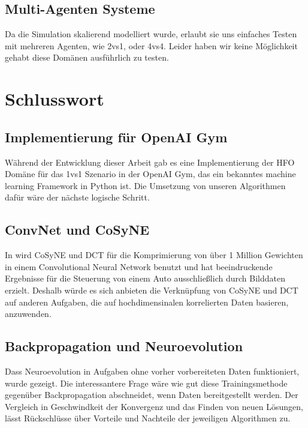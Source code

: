         \subsection*{Multi-Agenten Systeme}
            Da die Simulation skalierend modelliert wurde, erlaubt sie uns einfaches Testen mit mehreren Agenten, wie 2vs1, oder 4vs4. Leider haben wir keine Möglichkeit gehabt diese Domänen ausführlich zu testen.

\newpage

    \section{Schlusswort}

        \subsection*{Implementierung für OpenAI Gym}
            Während der Entwicklung dieser Arbeit gab es eine Implementierung der HFO Domäne für das 1vs1 Szenario in der OpenAI Gym, das ein bekanntes machine learning Framework in Python ist. Die Umsetzung von unseren Algorithmen dafür wäre der nächste logische Schritt.

        \subsection*{ConvNet und CoSyNE}
            In \cite{cosyne4} wird CoSyNE und DCT für die Komprimierung von über 1 Million Gewichten in einem Convolutional Neural Network benutzt und hat beeindruckende Ergebnisse für die Steuerung von einem Auto ausschließlich durch Bilddaten erzielt. Deshalb würde es sich anbieten die Verknüpfung von CoSyNE und DCT auf anderen Aufgaben, die auf hochdimensinalen korrelierten Daten basieren, anzuwenden.

        \subsection*{Backpropagation und Neuroevolution}
            Dass Neuroevolution in Aufgaben ohne vorher vorbereiteten Daten funktioniert, wurde gezeigt. Die interessantere Frage wäre wie gut diese Trainingsmethode gegenüber Backpropagation abschneidet, wenn Daten bereitgestellt werden. Der Vergleich in Geschwindkeit der Konvergenz und das Finden von neuen Lösungen, lässt Rückschlüsse über Vorteile und Nachteile der jeweiligen Algorithmen zu.

